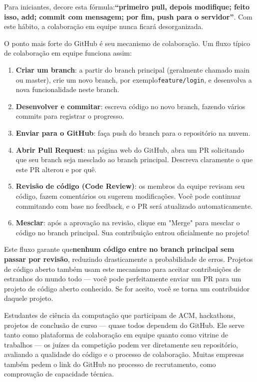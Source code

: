 Para iniciantes, decore esta fórmula:\textbf{“primeiro pull, depois modifique; feito isso, add; commit com mensagem; por fim, push para o servidor”}. Com este hábito, a colaboração em equipe nunca ficará desorganizada.


O ponto mais forte do GitHub é seu mecanismo de colaboração. Um fluxo típico de colaboração em equipe funciona assim:

\begin{enumerate}
  \item \textbf{Criar um branch}: a partir do branch principal (geralmente chamado main ou master), crie um novo branch, por exemplo\texttt{feature/\allowbreak login}, e desenvolva a nova funcionalidade neste branch.
  \item \textbf{Desenvolver e commitar}: escreva código no novo branch, fazendo vários commits para registrar o progresso.
  \item \textbf{Enviar para o GitHub}: faça push do branch para o repositório na nuvem.
  \item \textbf{Abrir Pull Request}: na página web do GitHub, abra um PR solicitando que seu branch seja mesclado ao branch principal. Descreva claramente o que este PR alterou e por quê.
  \item \textbf{Revisão de código (Code Review)}: os membros da equipe revisam seu código, fazem comentários ou sugerem modificações. Você pode continuar commitando com base no feedback, e o PR será atualizado automaticamente.
  \item \textbf{Mesclar}: após a aprovação na revisão, clique em "Merge" para mesclar o código no branch principal. Sua contribuição entrou oficialmente no projeto!
\end{enumerate}

Este fluxo garante que\textbf{nenhum código entre no branch principal sem passar por revisão}, reduzindo drasticamente a probabilidade de erros. Projetos de código aberto também usam este mecanismo para aceitar contribuições de estranhos do mundo todo — você pode perfeitamente enviar um PR para um projeto de código aberto conhecido. Se for aceito, você se torna um contribuidor daquele projeto.



Estudantes de ciência da computação que participam de ACM, hackathons, projetos de conclusão de curso — quase todos dependem do GitHub. Ele serve tanto como plataforma de colaboração em equipe quanto como vitrine de trabalhos — os juízes da competição podem ver diretamente seu repositório, avaliando a qualidade do código e o processo de colaboração. Muitas empresas também pedem o link do GitHub no processo de recrutamento, como comprovação de capacidade técnica.

